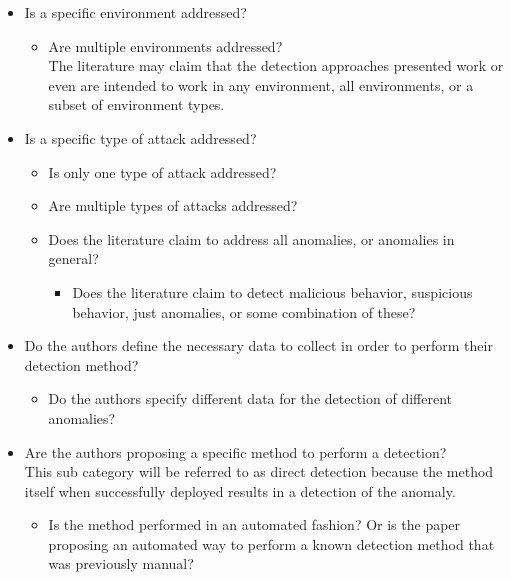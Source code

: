 \begin{itemize}
    \item Is a specific environment addressed?
        \begin{itemize}
            \item Are multiple environments addressed?\\
            The literature may claim that the detection approaches presented work or even are intended to work in any environment, all environments, or a subset of environment types.
        \end{itemize}
    \item Is a specific type of attack addressed?
    \begin{itemize}
        \item Is only one type of attack addressed?
        \item Are multiple types of attacks addressed? 
        \item Does the literature claim to address all anomalies, or anomalies in general? 
        \begin{itemize}
            \item Does the literature claim to detect malicious behavior, suspicious behavior, just anomalies, or some combination of these?
        \end{itemize}
    \end{itemize}
    \item Do the authors define the necessary data to collect in order to perform their detection method?
        \begin{itemize}
            \item Do the authors specify different data for the detection of different anomalies?
        \end{itemize}
    \item Are the authors proposing a specific method to perform a detection?\\
    This sub category will be referred to as direct detection because the method itself when successfully deployed results in a detection of the anomaly. 
        \begin{itemize}
            \item Is the method performed in an automated fashion? Or is the paper proposing an automated way to perform a known detection method that was previously manual?

\end{itemize}
\end{itemize}
